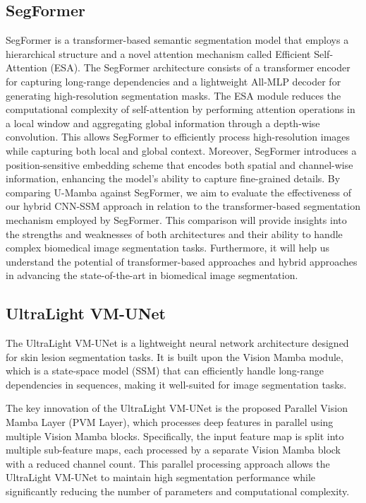 \documentclass[conference]{IEEEtran}
\begin{document}
\subsection{SegFormer}
SegFormer \cite{xie2021segformer} is a transformer-based semantic segmentation model that employs a hierarchical structure and a novel attention mechanism called Efficient Self-Attention (ESA). The SegFormer architecture consists of a transformer encoder for capturing long-range dependencies and a lightweight All-MLP decoder for generating high-resolution segmentation masks. The ESA module reduces the computational complexity of self-attention by performing attention operations in a local window and aggregating global information through a depth-wise convolution. This allows SegFormer to efficiently process high-resolution images while capturing both local and global context. Moreover, SegFormer introduces a position-sensitive embedding scheme that encodes both spatial and channel-wise information, enhancing the model's ability to capture fine-grained details. By comparing U-Mamba against SegFormer, we aim to evaluate the effectiveness of our hybrid CNN-SSM approach in relation to the transformer-based segmentation mechanism employed by SegFormer. This comparison will provide insights into the strengths and weaknesses of both architectures and their ability to handle complex biomedical image segmentation tasks. Furthermore, it will help us understand the potential of transformer-based approaches and hybrid approaches in advancing the state-of-the-art in biomedical image segmentation.

\subsection{UltraLight VM-UNet}
The UltraLight VM-UNet \cite{wu2024ultralight} is a lightweight neural network architecture designed for skin lesion segmentation tasks. It is built upon the Vision Mamba module, which is a state-space model (SSM) that can efficiently handle long-range dependencies in sequences, making it well-suited for image segmentation tasks.

The key innovation of the UltraLight VM-UNet is the proposed Parallel Vision Mamba Layer (PVM Layer), which processes deep features in parallel using multiple Vision Mamba blocks. Specifically, the input feature map is split into multiple sub-feature maps, each processed by a separate Vision Mamba block with a reduced channel count. This parallel processing approach allows the UltraLight VM-UNet to maintain high segmentation performance while significantly reducing the number of parameters and computational complexity.
\end{document}
